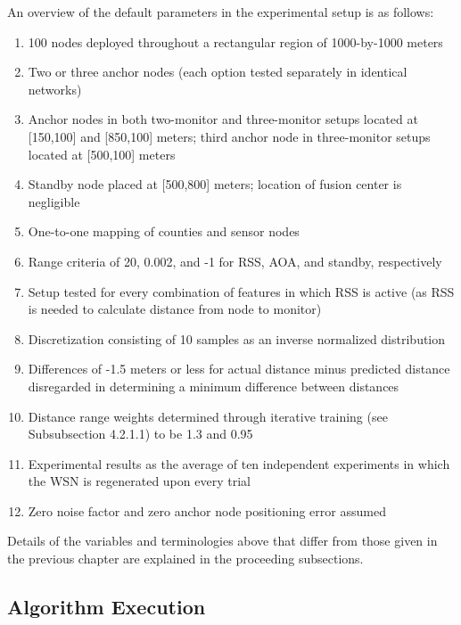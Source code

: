 \documentclass[12pt]{uthesis-v12}  %
\begin{document}

An overview of the default parameters in the experimental setup is as follows:

\begin{enumerate}
  \item 100 nodes deployed throughout a rectangular region of 1000-by-1000 meters
  \item Two or three anchor nodes (each option tested separately in identical networks)
  \item Anchor nodes in both two-monitor and three-monitor setups located at [150,100] and [850,100] meters; third anchor node in three-monitor setups located at [500,100] meters
  \item Standby node placed at [500,800] meters; location of fusion center is negligible
  \item One-to-one mapping of counties and sensor nodes
  \item Range criteria of 20, 0.002, and -1 for RSS, AOA, and standby, respectively
  \item Setup tested for every combination of features in which RSS is active (as RSS is needed to calculate distance from node to monitor)
  \item Discretization consisting of 10 samples as an inverse normalized distribution
  \item Differences of -1.5 meters or less for actual distance minus predicted distance disregarded in determining a minimum difference between distances
  \item Distance range weights determined through iterative training (see Subsubsection 4.2.1.1) to be 1.3 and 0.95
  \item Experimental results as the average of ten independent experiments in which the WSN is regenerated upon every trial
  \item Zero noise factor and zero anchor node positioning error assumed
\end{enumerate}

Details of the variables and terminologies above that differ from those given in the previous chapter are explained in the proceeding subsections.

\subsection{Algorithm Execution}
\end{document}

